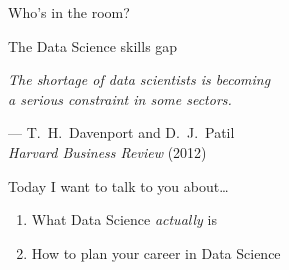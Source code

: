 \begin{frame}
    \begin{center}
        \LARGE%
        Who's in the room?
    \end{center}
\end{frame}

\begin{frame}
\end{frame}

\begin{frame}{The Data Science skills gap}
    \begin{center}
        \Large\it%
        The shortage of data scientists is becoming \\[\medskipamount]
        a serious constraint in some sectors.
    \end{center}
    \vfill
    \begin{flushright}
        --- T.\ H.\ Davenport and D.\ J.\ Patil \\
            \textit{Harvard Business Review} (2012)
    \end{flushright}
\end{frame}

\begin{frame}{Today I want to talk to you about\ldots}
    \Large%
    \begin{enumerate}
        \setlength{\itemsep}{\bigskipamount}
        \item What Data Science \emph{actually} is
        \item How to plan your career in Data Science
    \end{enumerate}
\end{frame}

